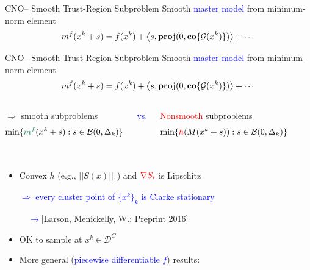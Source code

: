 \documentclass[handout,aspectratio=54]{beamer}
\numberwithin{theorem}{section}
\begin{document}
\begin{frame}{CNO– Smooth Trust-Region Subproblem}
Smooth \textcolor{blue}{master model} from minimum-norm element
\begin{equation*}
m^f(x^k+s)=f(x^k)+\left \langle s,\textup{\textbf{proj}}(0,\textup{\textbf{co}}\{\mathcal{G}(x^k)\})  \right \rangle+\cdots
\end{equation*}

\vspace{8cm}
\end{frame}

\begin{frame}{CNO– Smooth Trust-Region Subproblem}
Smooth \textcolor{blue}{master model} from minimum-norm element
\begin{equation*}
m^f(x^k+s)=f(x^k)+\left \langle s,\textup{\textbf{proj}}(0,\textup{\textbf{co}}\{\mathcal{G}(x^k)\})  \right \rangle+\cdots
\end{equation*}

\begin{columns}
\footnotesize
{}
$\Rightarrow$ \textcolor[RGB]{0,130,80}{smooth} subproblems
\begin{equation*}
\min\{\textcolor[RGB]{0,130,80}{m^f}(x^k+s):s\in\mathcal{B}(0,\Delta_k)\}
\end{equation*}

\textcolor{blue}{vs.}

\textcolor{red}{Nonsmooth} subproblems
\begin{equation*}
\min\{\textcolor{red}{h}(M(x^k+s)):s\in\mathcal{B}(0,\Delta_k)\}
\end{equation*}
\end{columns}

\begin{columns}
\footnotesize
{}
\begin{itemize}
\item Convex $h$ (e.g., $||S(x)||_1$) and $\textcolor{red}{\nabla S_i}$ is Lipschitz

\textcolor{blue}{$\Rightarrow$ every cluster point of $\{x^k\}_k$ is Clarke stationary}

$\quad$\scriptsize\textcolor{blue}{$\rightarrow$}\textcolor[RGB]{128,0,128}{[Larson, Menickelly, W.; Preprint 2016]}

\footnotesize
\item OK to sample at $x^k\in\mathcal{D}^C$
\item More general (\textcolor{blue}{piecewise differentiable $f$}) results:


\end{itemize}
\end{columns}
\end{frame}
\end{document}
